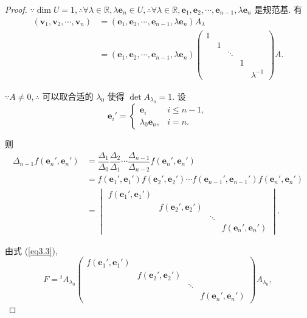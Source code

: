 \documentclass[color=black,device=normal,lang=cn,mode=geye]{elegantnote}
\begin{document}
\begin{proof}
    $\because\dim U=1,\therefore\forall\lambda\in\mathbb{R},\lambda\boldsymbol{e}_n\in U,\therefore\forall\lambda\in\mathbb{R},\boldsymbol{e}_1,\boldsymbol{e}_2,\cdots,\boldsymbol{e}_{n-1},\lambda\boldsymbol{e}_n$ 是规范基. 有
    \begin{align*}
        (\boldsymbol{v}_1,\boldsymbol{v}_2,\cdots,\boldsymbol{v}_n) & =(\boldsymbol{e}_1,\boldsymbol{e}_2,\cdots,\boldsymbol{e}_{n-1},\lambda\boldsymbol{e}_n)A_\lambda \\
        & =(\boldsymbol{e}_1,\boldsymbol{e}_2,\cdots,\boldsymbol{e}_{n-1},\lambda\boldsymbol{e}_n)\begin{pmatrix}
            1 \\
            & 1 \\
            && \ddots \\
            &&& 1 \\
            &&&& \lambda^{-1}
        \end{pmatrix}A.
    \end{align*}

    $\because A\neq0,\therefore$ 可以取合适的 $\lambda_0$ 使得 $\det A_{\lambda_0}=1$. 设
    \[\boldsymbol{e}_i'=\begin{cases}
        \boldsymbol{e}_i & i\leq n-1, \\
        \lambda_0\boldsymbol{e}_n, & i=n.
    \end{cases}\]

    则
    \begin{align*}
        \Delta_{n-1}f(\boldsymbol{e}_n',\boldsymbol{e}_n') & =\dfrac{\Delta_1}{\Delta_0}\dfrac{\Delta_2}{\Delta_1}\cdots\dfrac{\Delta_{n-1}}{\Delta_{n-2}}f(\boldsymbol{e}_n',\boldsymbol{e}_n') \\
        & =f(\boldsymbol{e}_1',\boldsymbol{e}_1')f(\boldsymbol{e}_2',\boldsymbol{e}_2')\cdots f(\boldsymbol{e}_{n-1}',\boldsymbol{e}_{n-1}')f(\boldsymbol{e}_n',\boldsymbol{e}_n') \\
        & =\begin{vmatrix}
            f(\boldsymbol{e}_1',\boldsymbol{e}_1') \\
            & f(\boldsymbol{e}_2',\boldsymbol{e}_2') \\
            && \ddots \\
            &&& f(\boldsymbol{e}_n',\boldsymbol{e}_n')
        \end{vmatrix}.
    \end{align*}

    由式 (\ref{eq3.3}),
    \[F={}^tA_{\lambda_0}\begin{pmatrix}
        f(\boldsymbol{e}_1',\boldsymbol{e}_1') \\
        & f(\boldsymbol{e}_2',\boldsymbol{e}_2') \\
        && \ddots \\
        &&& f(\boldsymbol{e}_n',\boldsymbol{e}_n')
    \end{pmatrix}A_{\lambda_0},\]


\end{proof}
\end{document}
